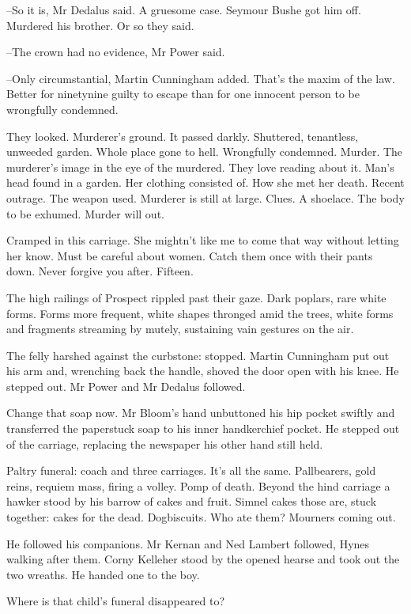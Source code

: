 --So it is,
Mr Dedalus said.
A gruesome case.
Seymour Bushe got him off.
Murdered his brother.
Or so they said.

--The crown had no evidence,
Mr Power said.

--Only circumstantial,
Martin Cunningham added.
That's the maxim of the law.
Better for ninetynine guilty to escape
than for one innocent person to be wrongfully condemned.

They looked.
Murderer's ground.
It passed darkly.
Shuttered, tenantless, unweeded garden.
Whole place gone to hell.
Wrongfully condemned.
Murder.
The murderer's image in the eye of the murdered.
They love reading about it.
Man's head found in a garden.
Her clothing consisted of.
How she met her death.
Recent outrage.
The weapon used.
Murderer is still at large.
Clues.
A shoelace.
The body to be exhumed.
Murder will out.

Cramped in this carriage.
She mightn't like me to come that way without letting her know.
Must be careful about women.
Catch them once with their pants down.
Never forgive you after.
Fifteen.

The high railings of Prospect rippled past their gaze.
Dark poplars, rare white forms.
Forms more frequent,
white shapes thronged amid the trees,
white forms and fragments streaming by mutely,
sustaining vain gestures on the air.

The felly harshed against the curbstone:
stopped.
Martin Cunningham put out his arm
and, wrenching back the handle,
shoved the door open with his knee.
He stepped out.
Mr Power and Mr Dedalus followed.

Change that soap now.
Mr Bloom's hand unbuttoned his hip pocket swiftly
and transferred the paperstuck soap to his inner handkerchief pocket.
He stepped out of the carriage,
replacing the newspaper his other hand still held.

Paltry funeral:
coach and three carriages.
It's all the same.
Pallbearers, gold reins, requiem mass, firing a volley.
Pomp of death.
Beyond the hind carriage
a hawker stood by his barrow of cakes and fruit.
Simnel cakes those are, stuck together:
cakes for the dead.
Dogbiscuits.
Who ate them?
Mourners coming out.

He followed his companions.
Mr Kernan and Ned Lambert followed,
Hynes walking after them.
Corny Kelleher stood by the opened hearse and took out the two wreaths.
He handed one to the boy.

Where is that child's funeral disappeared to?

